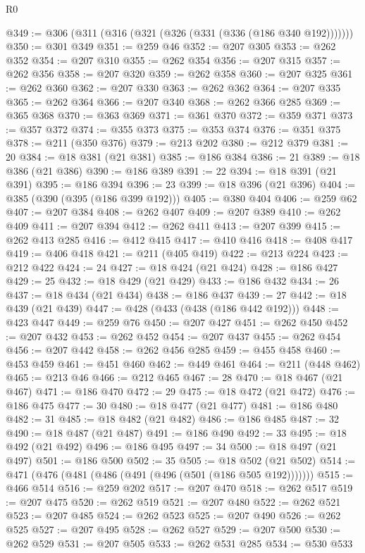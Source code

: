 \begin{lexlean}{R0}
\begin{coremodule}
@349 := @306 (@311 (@316 (@321 (@326 (@331 (@336 (@186 @340 @192)))))))
@350 := @301 @349
@351 := @259 @46
@352 := @207 @305
@353 := @262 @352
@354 := @207 @310
@355 := @262 @354
@356 := @207 @315
@357 := @262 @356
@358 := @207 @320
@359 := @262 @358
@360 := @207 @325
@361 := @262 @360
@362 := @207 @330
@363 := @262 @362
@364 := @207 @335
@365 := @262 @364
@366 := @207 @340
@368 := @262 @366 @285
@369 := @365 @368
@370 := @363 @369
@371 := @361 @370
@372 := @359 @371
@373 := @357 @372
@374 := @355 @373
@375 := @353 @374
@376 := @351 @375
@378 := @211 (@350 @376)
@379 := @213 @202
@380 := @212 @379
@381 := 20
@384 := @18 @381 (@21 @381)
@385 := @186 @384
@386 := 21
@389 := @18 @386 (@21 @386)
@390 := @186 @389
@391 := 22
@394 := @18 @391 (@21 @391)
@395 := @186 @394
@396 := 23
@399 := @18 @396 (@21 @396)
@404 := @385 (@390 (@395 (@186 @399 @192)))
@405 := @380 @404
@406 := @259 @62
@407 := @207 @384
@408 := @262 @407
@409 := @207 @389
@410 := @262 @409
@411 := @207 @394
@412 := @262 @411
@413 := @207 @399
@415 := @262 @413 @285
@416 := @412 @415
@417 := @410 @416
@418 := @408 @417
@419 := @406 @418
@421 := @211 (@405 @419)
@422 := @213 @224
@423 := @212 @422
@424 := 24
@427 := @18 @424 (@21 @424)
@428 := @186 @427
@429 := 25
@432 := @18 @429 (@21 @429)
@433 := @186 @432
@434 := 26
@437 := @18 @434 (@21 @434)
@438 := @186 @437
@439 := 27
@442 := @18 @439 (@21 @439)
@447 := @428 (@433 (@438 (@186 @442 @192)))
@448 := @423 @447
@449 := @259 @76
@450 := @207 @427
@451 := @262 @450
@452 := @207 @432
@453 := @262 @452
@454 := @207 @437
@455 := @262 @454
@456 := @207 @442
@458 := @262 @456 @285
@459 := @455 @458
@460 := @453 @459
@461 := @451 @460
@462 := @449 @461
@464 := @211 (@448 @462)
@465 := @213 @46
@466 := @212 @465
@467 := 28
@470 := @18 @467 (@21 @467)
@471 := @186 @470
@472 := 29
@475 := @18 @472 (@21 @472)
@476 := @186 @475
@477 := 30
@480 := @18 @477 (@21 @477)
@481 := @186 @480
@482 := 31
@485 := @18 @482 (@21 @482)
@486 := @186 @485
@487 := 32
@490 := @18 @487 (@21 @487)
@491 := @186 @490
@492 := 33
@495 := @18 @492 (@21 @492)
@496 := @186 @495
@497 := 34
@500 := @18 @497 (@21 @497)
@501 := @186 @500
@502 := 35
@505 := @18 @502 (@21 @502)
@514 := @471 (@476 (@481 (@486 (@491 (@496 (@501 (@186 @505 @192)))))))
@515 := @466 @514
@516 := @259 @202
@517 := @207 @470
@518 := @262 @517
@519 := @207 @475
@520 := @262 @519
@521 := @207 @480
@522 := @262 @521
@523 := @207 @485
@524 := @262 @523
@525 := @207 @490
@526 := @262 @525
@527 := @207 @495
@528 := @262 @527
@529 := @207 @500
@530 := @262 @529
@531 := @207 @505
@533 := @262 @531 @285
@534 := @530 @533

\end{coremodule}
\end{lexlean}

